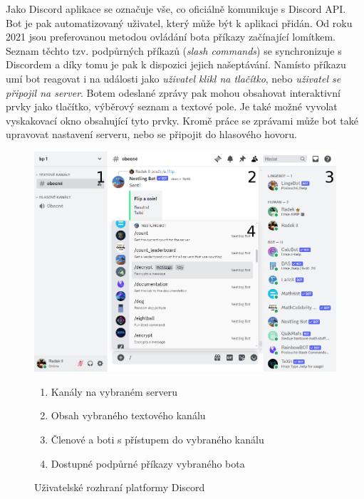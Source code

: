 \documentclass[FM]{tulthesis}
\begin{document}
	Jako Discord aplikace se označuje vše, co oficiálně komunikuje s Discord API. Bot je pak automatizovaný uživatel, který může být k aplikaci přidán. Od roku 2021 jsou preferovanou metodou ovládání bota příkazy začínající lomítkem. Seznam těchto tzv. podpůrných příkazů (\textit{slash commands}) se synchronizuje s Discordem a díky tomu je pak k dispozici jejich našeptávání. Namísto příkazu umí bot reagovat i na události jako \textit{uživatel klikl na tlačítko}, nebo \textit{uživatel se připojil na server}. Botem odeslané zprávy pak mohou obsahovat interaktivní prvky jako tlačítko, výběrový seznam a textové pole. Je také možné vyvolat vyskakovací okno obsahující tyto prvky. Kromě práce se zprávami může bot také upravovat nastavení serveru, nebo se připojit do hlasového hovoru. \cite{pdf_apps101}
	
	\begin{figure}[ht]
		\centering
		\includegraphics[width=\textwidth]{img/DiscordBotCommands}
		\begin{enumerate}[nolistsep]
			\item Kanály na vybraném serveru
			\item Obsah vybraného textového kanálu
			\item Členové a boti s přístupem do vybraného kanálu
			\item Dostupné podpůrné příkazy vybraného bota
		\end{enumerate}
		\caption{Uživatelské rozhraní platformy Discord}		
	\end{figure}
	
\end{document}
